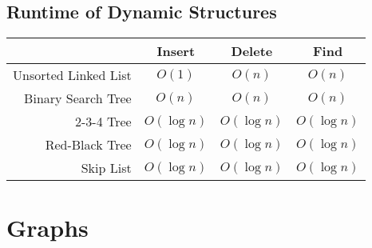 \documentclass[11pt,fleqn,a4paper,titlepage,dvipsnames,cmyk]{scrartcl}
\begin{document}
\subsection{Runtime of Dynamic Structures}%
\label{sub:Runtime of Dynamic Structures}
\begin{center}
    \begin{tabular}{|r|c|c|c|}
        \hline
       & {\color{blue}Insert} & {\color{blue}Delete} & {\color{blue}Find} \\ \hline
        Unsorted Linked List & $O(1)$ & $O(n)$ & $O(n)$ \\ \hline
        Binary Search Tree & $O(n)$ & $O(n)$ & $O(n)$ \\ \hhline{|=|=|=|=|}
        2-3-4 Tree & $O(\log n)$ & $O(\log n)$ & $O(\log n)$ \\ \hline
        Red-Black Tree & $O(\log n)$ & $O(\log n)$ & $O(\log n)$ \\ \hline
        Skip List & $O(\log n)$ & $O(\log n)$ & $O(\log n)$ \\ \hline
    \end{tabular}
\end{center}

\section{Graphs}%
\label{sec:Graphs}
\end{document}
